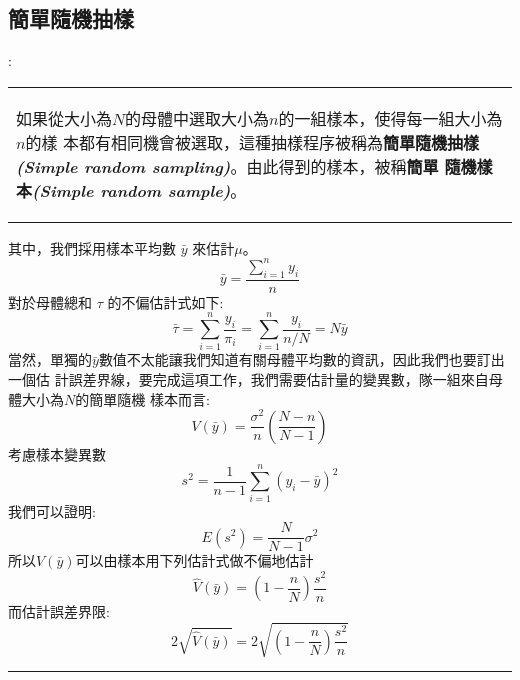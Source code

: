 		\subsection{簡單隨機抽樣{}}:		
			\begin{center}\colorbox{slight}{
				\begin{tabular}{p{}}
					\begin{de}\label{de:SRS}
						如果從大小為$N$的母體中選取大小為$n$的一組樣本，使得每一組大小為$n$的樣							本都有相同機會被選取，這種抽樣程序被稱為\textbf{簡單隨機抽樣									\emph{(Simple random sampling)}}。由此得到的樣本，被稱\textbf{簡單							隨機樣本\emph{(Simple random sample)}}。
					\end{de}
				\end{tabular}
			}
			\end{center}	
			其中，我們採用樣本平均數 $\bar{y}$ 來估計$ \mu $。
			$$ \bar{y} = \frac{\sum^{n}_{i=1} y_{i}}{n} $$
			對於母體總和 $ \tau $ 的不偏估計式如下:
			$$ \bar{\tau} = \sum^{n}_{i=1} \frac{y_i}{\pi_i} = \sum^{n}_{i=1} 						\frac{y_i}{n/N} =N \bar{y}$$
			當然，單獨的$\bar{y}$數值不太能讓我們知道有關母體平均數的資訊，因此我們也要訂出一個估				計誤差界線，要完成這項工作，我們需要估計量的變異數，隊一組來自母體大小為$N$的簡單隨機				樣本而言:
			$$ V(\bar{y}) = \frac{\sigma^2}{n} (\frac{N-n}{N-1}) $$
			考慮樣本變異數
			$$ s^2 = \frac{1}{n-1} \sum^{n}_{i=1} (y_i-\bar{y})^2 $$
			我們可以證明:
			$$ E(s^2)=\frac{N}{N-1}\sigma^2 $$
			所以$ V(\bar{y}) $可以由樣本用下列估計式做不偏地估計
			$$ \hat{V}(\bar{y}) = \left( 1 - \frac{n}{N} \right) \frac{s^2}{n} $$
			而估計誤差界限:
			$$ 2\sqrt{\hat{V}(\bar{y})}=2\sqrt{\left( 1-\frac{n}{N} \right)\frac{s^2}				{n}} $$
			\rule{\textwidth}{0.2pt}
